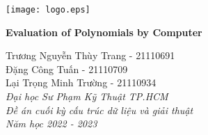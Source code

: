 \documentclass{article}
\title{}
\author{}
\date{}
\begin{document}
\Large
\begin{center}
  \begin{minipage}{.19\linewidth}
    \texttt{[image: logo.eps]}
  \end{minipage}
  \begin{minipage}{.6\linewidth}
    \begin{center}
      \Huge \textbf{Evaluation of Polynomials by Computer}
    \end{center}
  \end{minipage}
  \hspace{.03\linewidth}
  \begin{minipage}{0.16\linewidth}
    \begin{flushright}
      Trương Nguyễn Thùy Trang - 21110691\\
      Đặng Công Tuấn - 21110709\\
      Lại Trọng Minh Trường - 21110934\\
      \vspace{.1cm} \small \emph{Đại học Sư Phạm Kỹ Thuật TP.HCM}\\
      \vspace{.1cm} \small \emph{Đề án cuối kỳ cấu trúc dữ liệu và giải thuật}\\
      \vspace{.1cm} \small \emph{Năm học 2022 - 2023}
    \end{flushright}
  \end{minipage}
\end{center}

\vspace{.1cm}

\end{document}
